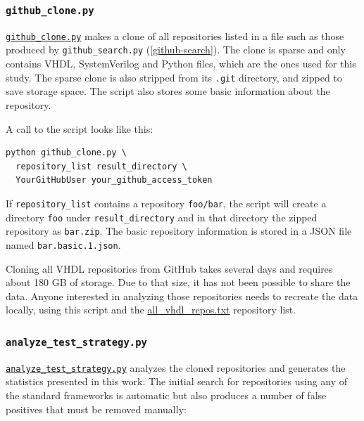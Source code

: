 \documentclass[]{report}
\begin{document}
\hypertarget{github_clone.py}{%
\subsubsection{\texorpdfstring{\texttt{github\_clone.py}}{github\_clone.py}}\label{github_clone.py}}

\href{https://github.com/LarsAsplund/github-facts/tree/main/py/github_clone.py}{\texttt{github\_clone.py}} makes a clone of all repositories listed in a file such as those produced by \texttt{github\_search.py} (\ref{github-search}). The clone is sparse and only contains VHDL, SystemVerilog and Python files, which are the ones used for this study. The sparse clone is also stripped from its \texttt{.git} directory, and zipped to save storage space. The script also stores some basic information about the repository.

A call to the script looks like this:

\begin{verbatim}
python github_clone.py \
  repository_list result_directory \
  YourGitHubUser your_github_access_token
\end{verbatim}

If \texttt{repository\_list} contains a repository \texttt{foo/bar}, the script will create a directory \texttt{foo} under \texttt{result\_directory} and in that directory the zipped repository as \texttt{bar.zip}. The basic repository information is stored in a JSON file named \texttt{bar.basic.1.json}.

Cloning all VHDL repositories from GitHub takes several days and requires about 180 GB of storage. Due to that size, it has not been possible to share the data. Anyone interested in analyzing those repositories needs to recreate the data locally, using this script and the \href{https://github.com/LarsAsplund/github-facts/tree/main/all_vhdl_repos.txt}{all\_vhdl\_repos.txt} repository list.

\hypertarget{analyze-test-strategy}{%
\subsubsection{\texorpdfstring{\texttt{analyze\_test\_strategy.py}}{analyze\_test\_strategy.py}}\label{analyze-test-strategy}}

\href{https://github.com/LarsAsplund/github-facts/tree/main/py/analyze_test_strategy.py}{\texttt{analyze\_test\_strategy.py}} analyzes the cloned repositories and generates the statistics presented in this work. The initial search for repositories using any of the standard frameworks is automatic but also produces a number of false positives that must be removed manually:
\end{document}
